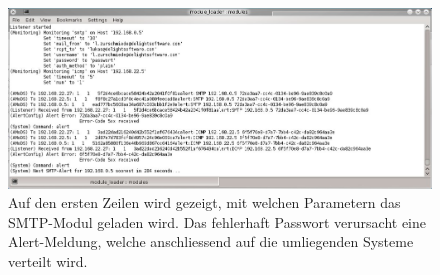 \begin{figure}[H]
  \centering
  \includegraphics[width=0.9\linewidth]{images/theorie/amods_email_error}
  \caption[Fehler beim \"uberwachen eines EMail-Servers]{Auf den ersten Zeilen wird gezeigt, mit welchen Parametern das SMTP-Modul geladen wird. Das fehlerhaft Passwort verursacht eine Alert-Meldung, welche anschliessend auf die umliegenden Systeme verteilt wird.}
  \label{fig:nat-source}
\end{figure}



